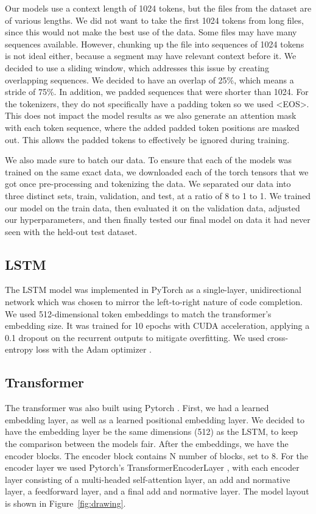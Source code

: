 \documentclass[11pt]{article}
\begin{document}
Our models use a context length of 1024 tokens, but the files from the dataset are of various lengths. We did not want to take the first 1024 tokens from long files, since this would not make the best use of the data. Some files may have many sequences available. However, chunking up the file into sequences of 1024 tokens is not ideal either, because a segment may have relevant context before it. We decided to use a sliding window, which addresses this issue by creating overlapping sequences. We decided to have an overlap of 25\%, which means a stride of 75\%. In addition, we padded sequences that were shorter than 1024. For the tokenizers, they do not specifically have a padding token so we used <EOS>. This does not impact the model results as we also generate an attention mask with each token sequence, where the added padded token positions are masked out. This allows the padded tokens to effectively be ignored during training.

We also made sure to batch our data. To ensure that each of the models was trained on the same exact data, we downloaded each of the torch tensors that we got once pre-processing and tokenizing the data. We separated our data into three distinct sets, train, validation, and test, at a ratio of 8 to 1 to 1. We trained our model on the train data, then evaluated it on the validation data, adjusted our hyperparameters, and then finally tested our final model on data it had never seen with the held-out test dataset.

\subsection{LSTM}

The LSTM model was implemented in PyTorch \cite{pytorch} as a single-layer, unidirectional network which was chosen to mirror the left-to-right nature of code completion. We used 512-dimensional token embeddings to match the transformer's embedding size. It was trained for 10 epochs with CUDA acceleration, applying a 0.1 dropout on the recurrent outputs to mitigate overfitting. We used cross-entropy loss with the Adam optimizer \cite{adam}.

\subsection{Transformer}

The transformer was also built using Pytorch \cite{pytorch}. First, we had a learned embedding layer, as well as a learned positional embedding layer. We decided to have the embedding layer be the same dimensions (512) as the LSTM, to keep the comparison between the models fair. After the embeddings, we have the encoder blocks. The encoder block contains N number of blocks, set to 8. For the encoder layer we used Pytorch's TransformerEncoderLayer \cite{pytorch}, with each encoder layer consisting of a multi-headed self-attention layer, an add and normative layer, a feedforward layer, and a final add and normative layer. The model layout is shown in Figure~\ref{fig:drawing}.
\end{document}
